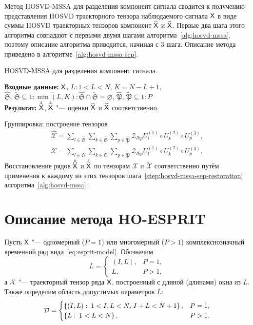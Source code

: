 \documentclass[specialist,
  substylefile=spbu.rtx,
subf,href,colorlinks=true, 12pt]{disser}
\theoremstyle{plain}
\theoremstyle{definition}
\theoremstyle{remark}
\newcommand{\Input}{\textbf{Входные данные: }}
\newcommand{\Output}{\textbf{Результат: }}
\begin{document}
Метод HOSVD-MSSA для разделения компонент сигнала сводится к получению представления HOSVD траекторного тензора
наблюдаемого сигнала $\mathsf{X}$ в виде суммы HOSVD траекторных тензоров компонент $\widehat{\mathsf{X}}$ и $\widetilde{\mathsf{X}}$.
Первые два шага этого алгоритма совпадают с первыми двумя шагами алгоритма~\ref{alg:hosvd-mssa}, поэтому
описание алгоритма приводится, начиная с 3 шага.
Описание метода приведено в алгоритме~\ref{alg:hosvd-mssa-sep}.
\begin{algorithm}[!ht]
  \caption{HOSVD-MSSA для разделения компонент сигнала.}
  \label{alg:hosvd-mssa-sep}
  \Input $\mathsf{X}$,
  $L: 1< L < N$, $K = N - L + 1$,
  $\widehat{\mathfrak{S}},\, \widetilde{\mathfrak{S}} \subseteq \overline{1:\min(L, K)}:
  \widehat{\mathfrak{S}} \cap \widetilde{\mathfrak{S}} = \varnothing$,
  $\widehat{\mathfrak{P}},\, \widetilde{\mathfrak{P}}  \subseteq \overline{1:P}$\\
  \Output $\mathring{\widehat{\mathsf{X}}}$, $\mathring{\widetilde{\mathsf{X}}}$ "--- оценки $\widehat{\mathsf{X}}$ и $\widetilde{\mathsf{X}}$
  соответственно.
  \begin{algorithmic}[1]
    \setcounter{ALG@line}{2}
    \State Группировка: построение тензоров
    \begin{gather*}
      \widehat{\mathcal{X}}=\sum_{l \in \widehat{\mathfrak{S}}} \sum_{k\in \widehat{\mathfrak{S}}}
      \sum_{p\in \widehat{\mathfrak{P}}}
      \mathcal{Z}_{lkp} U^{(1)}_{l}\circ U^{(2)}_{k} \circ U^{(3)}_{p},\\
      \widetilde{\mathcal{X}}=\sum_{l \in \widetilde{\mathfrak{S}}} \sum_{k\in \widetilde{\mathfrak{S}}}
      \sum_{p\in \widetilde{\mathfrak{P}}}
      \mathcal{Z}_{lkp} U^{(1)}_{l}\circ U^{(2)}_{k} \circ U^{(3)}_{p}.
    \end{gather*}
    \State Восстановление рядов $\mathring{\widehat{\mathsf{X}}}$ и $\mathring{\widetilde{\mathsf{X}}}$ по тензорам $\widehat{\mathcal{X}}$ и $\widetilde{\mathcal{X}}$ соответственно путём применения к
    каждому из этих тензоров шага~\ref{step:hosvd-mssa-sep-restoration} алгоритма~\ref{alg:hosvd-mssa}.
  \end{algorithmic}
\end{algorithm}

\section{Описание метода HO-ESPRIT}\label{seq:Tensor-esprit-description}
Пусть $\mathsf{X}$ "--- одномерный ($P=1$) или многомерный ($P>1$) комплекснозначный временной ряд
вида~\eqref{eq:esprit-model}.
Обозначим
\[
  \overline{L} =
  \begin{cases}
    (I, L), & P=1,\\
    L, & P>1,
  \end{cases}
\]
а $\mathcal{X}$ "--- траекторный тензор ряда $\mathsf{X}$, построенный с длиной (длинами) окна из $\overline{L}$.
Также определим область допустимых параметров $\overline{L}$:
\[
  \mathcal{D} =
  \begin{cases}
    \left\{ (I, L):\: 1< I,L <N,\, I + L < N + 1 \right\}, & P = 1,\\
    \left\{ L:\: 1< L <N \right\}, & P > 1.
  \end{cases}
\]
\end{document}
